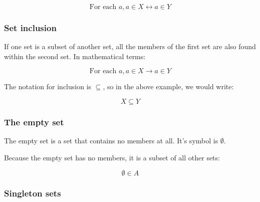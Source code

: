 \begin{dmath}
	\textrm{For each }a, a \in X \leftrightarrow a \in Y
\end{dmath}


\subsubsection{Set inclusion}

If one set is a subset of another set, all the members of the first set are also
found within the second set. In mathematical terms:

\begin{dmath}
	{\textrm{For each }a, a \in X \rightarrow a \in Y}
\end{dmath}

The notation for inclusion is $\subseteq$, so in the above example, we would
write:

\begin{dmath}
	X \subseteq Y
\end{dmath}


\subsubsection{The empty set}
\label{subsubsec:empty_set}

The empty set is a set that contains no members at all. It's symbol is
$\emptyset$.

Because the empty set has no members, it is a subset of all other sets:

\begin{dmath}
	\emptyset \in A
\end{dmath}


\subsubsection{Singleton sets}


